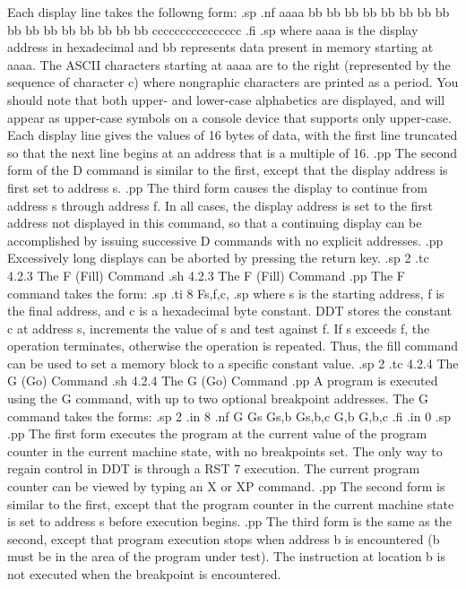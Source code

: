 Each display line takes the followng form:
.sp
.nf
aaaa bb bb bb bb bb bb bb bb bb bb bb bb bb bb bb bb cccccccccccccccc
.fi
.sp
where aaaa is the display address in hexadecimal and bb 
represents data present in memory starting at aaaa.  The ASCII 
characters starting at aaaa are to the right (represented by the 
sequence of character c) where nongraphic characters are printed as a 
period.  You should note that both upper- and lower-case 
alphabetics are displayed, and will appear as upper-case symbols 
on a console device that supports only upper-case.  Each display 
line gives the values of 16 bytes of data, with the first line 
truncated so that the next line begins at an address that is a 
multiple of 16.
.pp
The second form of the D command is similar to the first, except 
that the display address is first set to address s.  
.pp
The third form causes the display to continue from address s 
through address f.  In all cases, the display address is set to 
the first address not displayed in this command, so that a 
continuing display can be accomplished by issuing successive D 
commands with no explicit addresses.
.pp
Excessively long displays can be aborted by pressing the return key.
.sp 2
.tc         4.2.3  The F (Fill) Command
.sh
4.2.3  The F (Fill) Command
.pp
The F command takes the form:
.sp
.ti 8
Fs,f,c,
.sp
where s is the starting address, f is the final address, and c is 
a hexadecimal byte constant.  DDT stores the constant c at 
address s, increments the value of s and test against f.  If s 
exceeds f, the operation terminates, otherwise the operation is 
repeated.  Thus, the fill command can be used to set a memory 
block to a specific constant value.
.sp 2
.tc         4.2.4  The G (Go) Command
.sh
4.2.4  The G (Go) Command
.pp
A program is executed using the G command, with up to two 
optional breakpoint addresses.  The G command takes the forms:
.sp 2
.in 8
.nf
G
Gs
Gs,b
Gs,b,c
G,b
G,b,c
.fi
.in 0
.sp 
.pp
The first form executes the program at the current value of the 
program counter in the current machine state, with no breakpoints 
set.  The only way to regain control in DDT is through a RST 7 
execution.  The current program counter can be viewed by typing 
an X or XP command.  
.pp
The second form is similar to the first, except that the program 
counter in the current machine state is set to address s before 
execution begins.  
.pp
The third form is the same as the second, except that program 
execution stops when address b is encountered (b must be in the 
area of the program under test).  The instruction at location b is 
not executed when the breakpoint is encountered.  
